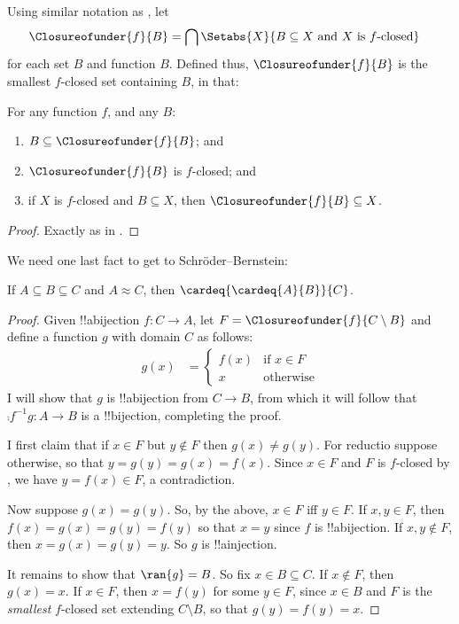 \documentclass[../../../include/open-logic-section]{subfiles}
\begin{document}
Using similar notation as , let
\begin{align*}
\Closureofunder{f}{B} &= \bigcap \Setabs{X}{B \subseteq X\text{ and }X\text{ is }f\text{-closed}} 
\end{align*}
for each set $B$ and function $B$. Defined thus, $\Closureofunder{f}{B}$ is the smallest $f$-closed set containing $B$, in that:
\begin{prop}
	For any function $f$, and any $B$:
	\begin{enumerate}
		\item{} $B \subseteq \Closureofunder{f}{B}$; and
		\item{} $\Closureofunder{f}{B}$ is $f$-closed; and
		\item{} if $X$ is $f$-closed and $B \subseteq X$, then $\Closureofunder{f}{B} \subseteq X$.
	\end{enumerate}
\end{prop}
\begin{proof}
	Exactly as in .
\end{proof}\noindent
We need one last fact to get to Schr\"oder--Bernstein:
\begin{prop}
	If $A \subseteq B \subseteq C$ and $A \approx C$, then $\cardeq{\cardeq{A}{B}}{C}$.
\end{prop}
\begin{proof}
	Given !!a{bijection}  $f \colon C \to A$, let $F = \Closureofunder{f}{C \setminus B}$ and define a function $g$ with domain $C$ as follows:
	\begin{align*}
		g(x) &= \begin{cases}
			f(x) &\text{if }x \in F\\
			x&\text{otherwise}
		\end{cases}
	\end{align*}
	I will show that $g$ is !!a{bijection} from $C \to B$, from which it will follow that $\comp{f^{-1}}{g} \colon A \to B$ is a !!{bijection}, completing the proof.
		
	I first claim that if $x \in F$ but $y\notin F$ then $g(x) \neq g(y)$. For reductio suppose otherwise, so that $y = g(y) = g(x) = f(x)$. Since $x \in F$ and $F$ is $f$-closed by , we have $y = f(x) \in F$, a contradiction. 
				
	Now suppose $g(x) = g(y)$. So, by the above, $x \in F$ iff $y \in F$. If $x, y \in F$, then $f(x) = g (x) = g(y) = f(y)$ so that $x = y$ since $f$ is !!a{bijection}. If  $x, y \notin F$, then $x = g(x) = g(y) = y$. So $g$ is !!a{injection}.
	
	It remains to show that $\ran{g} = B$. So fix $x \in B \subseteq C$. If $x \notin F$, then $g(x) = x$. If $x \in F$, then $x = f(y)$ for some $y \in F$, since $x \in B$ and $F$ is the \emph{smallest} $f$-closed set extending $C \setminus B$, so that $g(y) = f(y) = x$.  
\end{proof}\noindent
\end{document}

